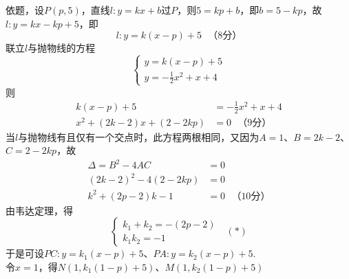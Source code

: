 \documentclass[10pt]{article}
\begin{document}
\begin{questions}{\answeringintroduction}
\begin{subquestions}
        \begin{figure}[!htb]
            \raggedleft
        \end{figure}
        \subquestion 依题，设$P(p,5)$，直线$l:y=kx+b$过$P$，则$5=kp+b$，即$b=5-kp$，故$l:y=kx-kp+5$，即
        $$l:y=k(x-p)+5 \ \ \ （8分）$$
        联立$l$与抛物线的方程
        $$\begin{cases}
            y=k(x-p)+5 \\
            y=-\frac{1}{2}x^2+x+4
        \end{cases}$$
        则
        $$\begin{aligned}
            k(x-p)+5 &= -\frac{1}{2}x^2+x+4 \\
            x^2+(2k-2)x+(2-2kp) &= 0 \ \ \ （9分）
        \end{aligned}$$
        当$l$与抛物线有且仅有一个交点时，此方程两根相同，又因为$A=1$、$B=2k-2$、$C=2-2kp$，故
        $$\begin{aligned}
            \Delta = B^2 - 4AC &= 0 \\
            (2k-2)^2-4(2-2kp) &= 0 \\
            k^2+(2p-2)k-1 &= 0 \ \ \ （10分）
        \end{aligned}$$
        由韦达定理，得
        $$\begin{cases}
            k_1+k_2 = -(2p-2) \\
            k_1k_2 = -1
        \end{cases} \ \ \ (*)$$
        于是可设$PC:y=k_1(x-p)+5$、$PA:y=k_2(x-p)+5$. \\
        令$x=1$，得$N(1,k_1(1-p)+5)$、$M(1,k_2(1-p)+5)$\\

\end{subquestions}
\end{questions}
\end{document}
